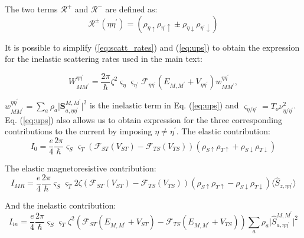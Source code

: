 \documentclass[reprint,amsmath,amssymb,aps,nofootinbib,onecolumn]{revtex4-2}
\begin{document}
The two terms $\mathcal{R}^{+}$ and $\mathcal{R}^{-}$ are defined as:
\begin{equation}
    \mathcal{R}^{\pm}(\eta\eta^{\prime})=\left( \rho_{\eta \uparrow} \rho_{\eta^{\prime}\uparrow} \pm \rho_{\eta \downarrow} \rho_{\eta^{\prime}\downarrow} \right)
    \label{eq:R_+-}
\end{equation}

It is possible to simplify (\ref{eq:scatt_rates}) and (\ref{eq:ups}) to obtain the expression for the inelastic scattering rates used in the main text:

\begin{equation}
    W_{MM^{\prime}}^{\eta \eta^{\prime}}=\dfrac{2\pi}{\hbar} \zeta^2 \varsigma_{\eta} \varsigma_{\eta^{\prime}} \mathcal{F}_{\eta\eta^{\prime}}(E_{M,M^{\prime}}+V_{\eta \eta^{\prime}} )  w_{MM^{\prime}}^{\eta \eta^{\prime}},
    \label{eq:elec_rates}
\end{equation}

 $w_{MM^{\prime}}^{\eta \eta^{\prime}} = \sum_{a} \rho_a \lvert {\textbf{S}_{a,\eta\eta^{\prime}}^{M,M^{\prime}}}\rvert^{2}$ is the inelastic term in Eq. (\ref{eq:ups}) and $\varsigma_{\eta/\eta^{\prime}} = T_o \nu^2_{\eta/\eta^{\prime}}$. Eq. (\ref{eq:ups}) also allows us to obtain expression for the three corresponding contributions to the current by imposing $\eta \neq \eta^{\prime} $.
The elastic contribution:
\begin{equation}
I_0=\dfrac{e}{4} \dfrac{2\pi}{\hbar}  \varsigma_{S} \varsigma_{T} \left( \mathcal{F}_{ST}(V_{ST})-\mathcal{F}_{TS}(V_{TS}) \right) \left( \rho_{S \uparrow} \rho_{T\uparrow} + \rho_{S \downarrow} \rho_{T\downarrow} \right)
\label{eq:I_0}
\end{equation}

The elastic magnetoresistive contribution:
\begin{equation}
I_{MR}=\dfrac{e}{4} \dfrac{2\pi}{\hbar}\varsigma_{S} \varsigma_{T}  2 \zeta  \left( \mathcal{F}_{ST}(V_{ST})-\mathcal{F}_{TS}(V_{TS}) \right) \left( \rho_{S \uparrow} \rho_{T\uparrow} - \rho_{S \downarrow} \rho_{T\downarrow} \right) \langle \hat{S}_{z,\eta\eta^{\prime}} \rangle
\label{eq:I_MR}
\end{equation}

And the inelastic contribution:
\begin{equation}
I_{in}=\dfrac{e}{4} \dfrac{2\pi}{\hbar}\varsigma_{S} \varsigma_{T} \zeta^2  \left( \mathcal{F}_{ST}(E_{M,M^{\prime}}+V_{ST})-\mathcal{F}_{TS}(E_{M,M^{\prime}}+V_{TS}) \right) \sum_{a} \rho_a \lvert {\hat{S}_{a,\eta\eta^{\prime}}^{M,M^{\prime}}}\rvert^{2}
\label{eq:I_in}
\end{equation}
\end{document}
